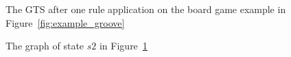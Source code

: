 \begin{figure}[ht]
  \begin{center}
    
  \end{center}
  \caption{The GTS after one rule application on the board game example in Figure~\ref{fig:example_groove}}
  \label{fig:gts_example}
\end{figure}

\begin{figure}[ht]
  \begin{center}
    
  \end{center}
  \caption{The graph of state $s2$ in Figure~\ref{fig:gts_example}}
  \label{fig:target_graph_state}
\end{figure}
